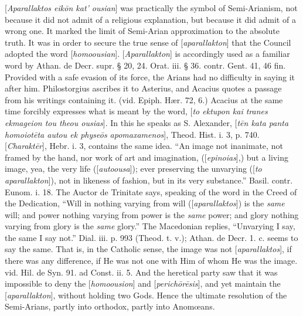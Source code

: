 [\emph{Aparallaktos eik\={o}n kat'
ousian}] was practically the symbol of Semi-Arianism, not
because it did not admit of a religious explanation, but because it
did admit of a wrong one. It marked the limit of Semi-Arian
approximation to the absolute truth. It was in order to secure the
true sense of [\emph{aparallakton}] that the Council adopted the word
[\emph{homoousian}]. [\emph{Aparallakton}] is accordingly used as a
familiar word by Athan. de Decr. supr. § 20, 24. Orat. iii. § 36.
contr. Gent. 41, 46 fin. Provided with a safe evasion of its force,
the Arians had no difficulty in saying it after him. Philostorgius
ascribes it to Asterius, and Acacius quotes a passage from his
writings containing it. (vid. Epiph. Hær. 72, 6.) Acacius at the same
time forcibly expresses what is meant by the word, [\emph{to ektupon kai
tranes ekmageion tou theou ousias}]. In this he speaks as S.
Alexander, [\emph{t\={e}n kata panta homoiot\={e}ta autou ek physe\={o}s
apomaxamenos}], Theod. Hist. i. 3, p. 740. [\emph{Charakt\={e}r}],
Hebr. i. 3, contains the same idea. ``An image not inanimate, not
framed by the hand, nor work of art and imagination, ([\emph{epinoias}],)
but a living image, yea, the very life ([\emph{autoousa}]); ever
preserving the unvarying ([\emph{to aparallakton}]), not in likeness
of fashion, but in its very substance.'' Basil. contr. Eunom. i. 18.
The Auctor de Trinitate says, speaking of the word in the Creed of the
Dedication, ``Will in nothing varying from will ([\emph{aparallaktos}])
is the \emph{same} will; and power nothing varying from power is the \emph{same}
power; and glory nothing varying from glory is the \emph{same} glory.''
The Macedonian replies, ``Unvarying I say, the same I say not.'' Dial.
iii. p. 993 (Theod. t. v.); Athan. de Decr. 1. c. seems to say the
same. That is, in the Catholic sense, the image was not [\emph{aparallaktos}],
if there was any difference, if He was not one with Him of whom
He was the image. vid. Hil. de Syn. 91. ad Const. ii. 5. And the
heretical party saw that it was impossible to deny the [\emph{homoousion}]
and [\emph{perich\={o}r\={e}sis}], and yet maintain the [\emph{aparallakton}],
without holding two Gods. Hence the ultimate resolution of the
Semi-Arians, partly into orthodox, partly into Anomœans.

